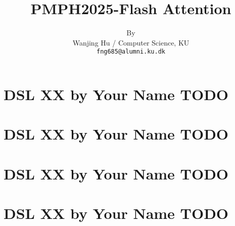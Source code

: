 \documentclass[11pt]{article}
\title{PMPH2025-Flash Attention}
\author{By \\
  Wanjing Hu / Computer Science, KU  \\
  \texttt{fng685@alumni.ku.dk} \\}
\begin{document}
\maketitle

\section{DSL XX by Your Name TODO}
\section{DSL XX by Your Name TODO}
\section{DSL XX by Your Name TODO}
\section{DSL XX by Your Name TODO}
\end{document}
